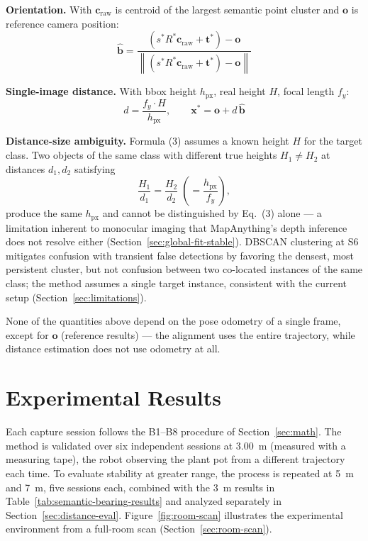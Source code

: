 \documentclass[conference]{IEEEtran}
\begin{document}
\textbf{Orientation.} With $\mathbf{c}_{\text{raw}}$ is centroid of the largest semantic point cluster and $\mathbf{o}$ is reference camera position:
\begin{equation}
\hat{\mathbf{b}} = \frac{\left(s^* R^* \mathbf{c}_{\text{raw}} + \mathbf{t}^*\right) - \mathbf{o}}{\left\lVert \left(s^* R^* \mathbf{c}_{\text{raw}} + \mathbf{t}^*\right) - \mathbf{o} \right\rVert}
\end{equation}

\textbf{Single-image distance.} With bbox height $h_{\text{px}}$, real height  $H$, focal length $f_y$:
\begin{equation}
d = \frac{f_y \cdot H}{h_{\text{px}}}, \qquad
\mathbf{x}^* = \mathbf{o} + d \, \hat{\mathbf{b}}
\end{equation}

\textbf{Distance-size ambiguity.} Formula (3) assumes a known height $H$ for the target class. Two objects of the same class with different true heights $H_1 \neq H_2$ at distances $d_1, d_2$ satisfying
\begin{equation}
\frac{H_1}{d_1} = \frac{H_2}{d_2} \;\left(= \frac{h_{\text{px}}}{f_y}\right),
\end{equation}
produce the same $h_{\text{px}}$ and cannot be distinguished by Eq.~(3) alone — a limitation inherent to monocular imaging that MapAnything's depth inference does not resolve either (Section~\ref{sec:global-fit-stable}). DBSCAN clustering at S6 mitigates confusion with transient false detections by favoring the densest, most persistent cluster, but not confusion between two co-located instances of the same class; the method assumes a single target instance, consistent with the current setup (Section~\ref{sec:limitations}).

None of the quantities above depend on the pose odometry of a single frame, except for $\mathbf{o}$ (reference results) — the alignment uses the entire trajectory, while distance estimation does not use odometry at all.


\section{Experimental Results}
\label{sec:semantic-bearing}

Each capture session follows the B1--B8 procedure of Section~\ref{sec:math}. The method is validated over six independent sessions at \SI{3.00}{\meter} (measured with a measuring tape), the robot observing the plant pot from a different trajectory each time. To evaluate stability at greater range, the process is repeated at \SI{5}{\meter} and \SI{7}{\meter}, five sessions each, combined with the \SI{3}{\meter} results in Table~\ref{tab:semantic-bearing-results} and analyzed separately in Section~\ref{sec:distance-eval}. Figure~\ref{fig:room-scan} illustrates the experimental environment from a full-room scan (Section~\ref{sec:room-scan}).
\end{document}
